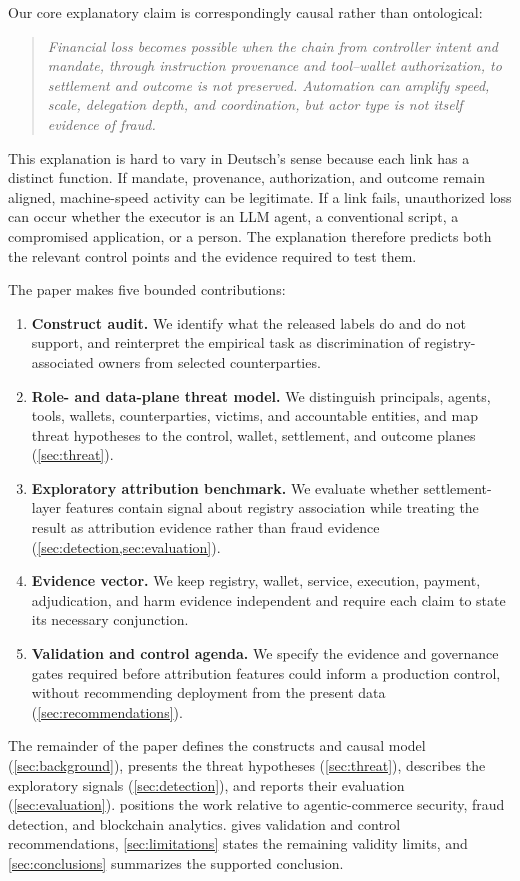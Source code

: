Our core explanatory claim is correspondingly causal rather than ontological:

\begin{quote}
\itshape
Financial loss becomes possible when the chain from controller intent and
mandate, through instruction provenance and tool--wallet authorization, to
settlement and outcome is not preserved.  Automation can amplify speed, scale,
delegation depth, and coordination, but actor type is not itself evidence of
fraud.
\end{quote}

This explanation is hard to vary in Deutsch's sense\cite{deutsch2011} because
each link has a distinct function.  If mandate, provenance, authorization, and
outcome remain aligned, machine-speed activity can be legitimate.  If a link
fails, unauthorized loss can occur whether the executor is an LLM agent, a
conventional script, a compromised application, or a person.  The explanation
therefore predicts both the relevant control points and the evidence required
to test them.

The paper makes five bounded contributions:
\begin{enumerate}[leftmargin=*,nosep]
  \item \textbf{Construct audit.} We identify what the released labels do and
    do not support, and reinterpret the empirical task as discrimination of
    registry-associated owners from selected counterparties.
  \item \textbf{Role- and data-plane threat model.} We distinguish principals,
    agents, tools, wallets, counterparties, victims, and accountable entities,
    and map threat hypotheses to the control, wallet, settlement, and outcome
    planes (\cref{sec:threat}).
  \item \textbf{Exploratory attribution benchmark.} We evaluate whether
    settlement-layer features contain signal about registry association while
    treating the result as attribution evidence rather than fraud evidence
    (\cref{sec:detection,sec:evaluation}).
  \item \textbf{Evidence vector.} We keep registry, wallet, service,
    execution, payment, adjudication, and harm evidence independent and require
    each claim to state its necessary conjunction.
  \item \textbf{Validation and control agenda.} We specify the evidence and
    governance gates required before attribution features could inform a
    production control, without recommending deployment from the present data
    (\cref{sec:recommendations}).
\end{enumerate}

The remainder of the paper defines the constructs and causal model
(\cref{sec:background}), presents the threat hypotheses (\cref{sec:threat}),
describes the exploratory signals (\cref{sec:detection}), and reports their
evaluation (\cref{sec:evaluation}).   positions the work
relative to agentic-commerce security, fraud detection, and blockchain
analytics.   gives validation and control
recommendations, \cref{sec:limitations} states the remaining validity limits,
and \cref{sec:conclusions} summarizes the supported conclusion.
